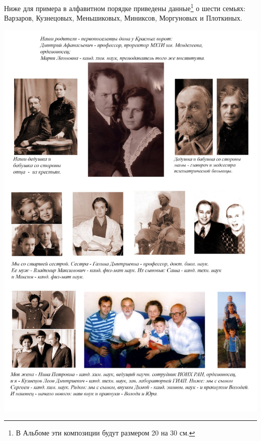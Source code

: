 Ниже для примера в алфавитном порядке приведены данные\footnote{В Альбоме эти композиции будут размером 20 на 30 см.} о шести семьях: Варзаров, Кузнецовых, Меньшиковых, Миниксов, Моргуновых и Плоткиных.





\noindent
\includegraphics[height=\paperheight]{inc/kuznecovy}





